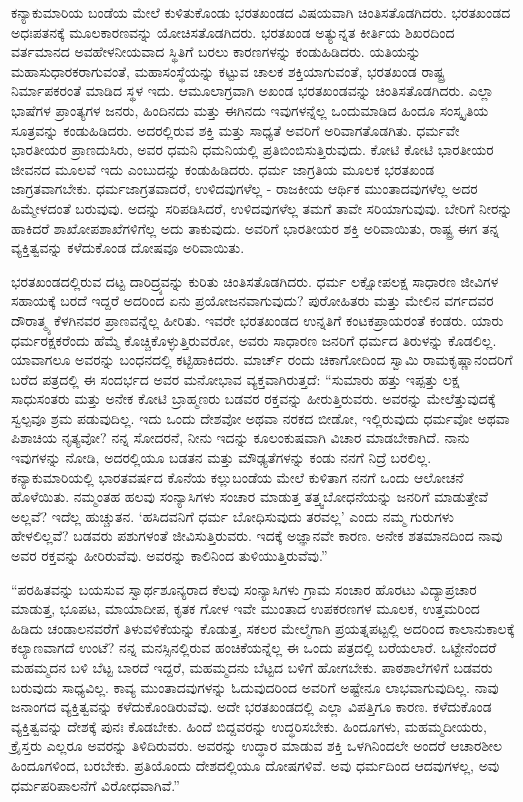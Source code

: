  ಕನ್ಯಾಕುಮಾರಿಯ ಬಂಡೆಯ ಮೇಲೆ ಕುಳಿತುಕೊಂಡು ಭರತಖಂಡದ ವಿಷಯವಾಗಿ ಚಿಂತಿಸತೊಡಗಿದರು. ಭರತಖಂಡದ ಅಧಃಪತನಕ್ಕೆ ಮೂಲಕಾರಣವನ್ನು ಯೋಚಿಸತೊಡಗಿದರು. ಭರತಖಂಡ ಅತ್ಯುನ್ನತ ಕೀರ್ತಿಯ ಶಿಖರದಿಂದ ವರ್ತಮಾನದ ಅವಹೇಳನೀಯವಾದ ಸ್ಥಿತಿಗೆ ಬರಲು ಕಾರಣಗಳನ್ನು ಕಂಡುಹಿಡಿದರು. ಯತಿಯನ್ನು ಮಹಾಸುಧಾರಕರಾಗುವಂತೆ, ಮಹಾಸಂಸ್ಥೆಯನ್ನು ಕಟ್ಟುವ ಚಾಲಕ ಶಕ್ತಿಯಾಗುವಂತೆ, ಭರತಖಂಡ ರಾಷ್ಟ್ರ ನಿರ್ಮಾಪಕರಂತೆ ಮಾಡಿದ ಸ್ಥಳ ಇದು. ಆಮೂಲಾಗ್ರವಾಗಿ ಅಖಂಡ ಭರತಖಂಡವನ್ನು ಚಿಂತಿಸತೊಡಗಿದರು. ಎಲ್ಲಾ ಭಾಷೆಗಳ ಪ್ರಾಂತ್ಯಗಳ ಜನರು, ಹಿಂದಿನದು ಮತ್ತು ಈಗಿನದು ಇವುಗಳನ್ನೆಲ್ಲ ಒಂದುಮಾಡಿದ ಹಿಂದೂ ಸಂಸ್ಕೃತಿಯ ಸೂತ್ರವನ್ನು ಕಂಡುಹಿಡಿದರು. ಅದರಲ್ಲಿರುವ ಶಕ್ತಿ ಮತ್ತು ಸಾಧ್ಯತೆ ಅವರಿಗೆ ಅರಿವಾಗತೊಡಗಿತು. ಧರ್ಮವೇ ಭಾರತೀಯರ ಪ್ರಾಣದುಸಿರು, ಅವರ ಧಮನಿ ಧಮನಿಯಲ್ಲಿ ಪ್ರತಿಬಿಂಬಿಸುತ್ತಿರುವುದು. ಕೋಟಿ ಕೋಟಿ ಭಾರತೀಯರ ಜೀವನದ ಮೂಲವೆ ಇದು ಎಂಬುದನ್ನು ಕಂಡುಹಿಡಿದರು. ಧರ್ಮ ಜಾಗ್ರತಿಯ ಮೂಲಕ ಭರತಖಂಡ ಜಾಗ್ರತವಾಗಬೇಕು. ಧರ್ಮಜಾಗ್ರತವಾದರೆ, ಉಳಿದವುಗಳೆಲ್ಲ - ರಾಜಕೀಯ ಆರ್ಥಿಕ ಮುಂತಾದವುಗಳೆಲ್ಲ ಅದರ ಹಿಮ್ಮೇಳದಂತೆ ಬರುವುವು. ಅದನ್ನು ಸರಿಪಡಿಸಿದರೆ, ಉಳಿದವುಗಳೆಲ್ಲ ತಮಗೆ ತಾವೇ ಸರಿಯಾಗುವುವು. ಬೇರಿಗೆ ನೀರನ್ನು ಹಾಕಿದರೆ ಶಾಖೋಪಶಾಖೆಗಳಿಗೆಲ್ಲ ಅದು ತಾಕುವುದು. ಅವರಿಗೆ ಭಾರತೀಯರ ಶಕ್ತಿ ಅರಿವಾಯಿತು, ರಾಷ್ಟ್ರ ಈಗ ತನ್ನ ವ್ಯಕ್ತಿತ್ವವನ್ನು ಕಳೆದುಕೊಂಡ ದೋಷವೂ ಅರಿವಾಯಿತು. 

 ಭರತಖಂಡದಲ್ಲಿರುವ ದಟ್ಟ ದಾರಿದ್ರ್ಯವನ್ನು ಕುರಿತು ಚಿಂತಿಸತೊಡಗಿದರು. ಧರ್ಮ ಲಕ್ಷೋಪಲಕ್ಷ ಸಾಧಾರಣ ಜೀವಿಗಳ ಸಹಾಯಕ್ಕೆ ಬರದೆ ಇದ್ದರೆ ಅದರಿಂದ ಏನು ಪ್ರಯೋಜನವಾಗುವುದು? ಪುರೋಹಿತರು ಮತ್ತು ಮೇಲಿನ ವರ್ಗದವರ ದೌರಾತ್ಮ್ಯ ಕೆಳಗಿನವರ ಪ್ರಾಣವನ್ನೆಲ್ಲ ಹೀರಿತು. ಇವರೇ ಭರತಖಂಡದ ಉನ್ನತಿಗೆ ಕಂಟಕಪ್ರಾಯರಂತೆ ಕಂಡರು. ಯಾರು ಧರ್ಮರಕ್ಷಕರೆಂದು ಹೆಮ್ಮೆ ಕೊಚ್ಚಿಕೊಳ್ಳುತ್ತಿರುವರೋ, ಅವರು ಸಾಧಾರಣ ಜನರಿಗೆ ಧರ್ಮದ ತಿರುಳನ್ನು ಕೊಡಲಿಲ್ಲ. ಯಾವಾಗಲೂ ಅವರನ್ನು ಬಂಧನದಲ್ಲಿ ಕಟ್ಟಿಹಾಕಿದರು.  ಮಾರ್ಚ್ ರಂದು ಚಿಕಾಗೋದಿಂದ ಸ್ವಾಮಿ ರಾಮಕೃಷ್ಣಾನಂದರಿಗೆ ಬರೆದ ಪತ್ರದಲ್ಲಿ ಈ ಸಂದರ್ಭದ ಅವರ ಮನೋಭಾವ ವ್ಯಕ್ತವಾಗಿರುತ್ತದೆ: “ಸುಮಾರು ಹತ್ತು ಇಪ್ಪತ್ತು ಲಕ್ಷ ಸಾಧುಸಂತರು ಮತ್ತು ಅನೇಕ ಕೋಟಿ ಬ್ರಾಹ್ಮಣರು ಬಡವರ ರಕ್ತವನ್ನು ಹೀರುತ್ತಿರುವರು. ಅವರನ್ನು ಮೇಲೆತ್ತುವುದಕ್ಕೆ ಸ್ವಲ್ಪವೂ ಶ್ರಮ ಪಡುವುದಿಲ್ಲ. ಇದು ಒಂದು ದೇಶವೋ ಅಥವಾ ನರಕದ ಬೀಡೋ, ಇಲ್ಲಿರುವುದು ಧರ್ಮವೋ ಅಥವಾ ಪಿಶಾಚಿಯ ನೃತ್ಯವೋ? ನನ್ನ ಸೋದರನೆ, ನೀನು ಇದನ್ನು ಕೂಲಂಕುಷವಾಗಿ ವಿಚಾರ ಮಾಡಬೇಕಾಗಿದೆ. ನಾನು ಇವುಗಳನ್ನು ನೋಡಿ, ಅದರಲ್ಲಿಯೂ ಬಡತನ ಮತ್ತು ಮೌಢ್ಯತೆಗಳನ್ನು ಕಂಡು ನನಗೆ ನಿದ್ರೆ ಬರಲಿಲ್ಲ. ಕನ್ಯಾಕುಮಾರಿಯಲ್ಲಿ ಭಾರತವರ್ಷದ ಕೊನೆಯ ಕಲ್ಲುಬಂಡೆಯ ಮೇಲೆ ಕುಳಿತಾಗ ನನಗೆ ಒಂದು ಆಲೋಚನೆ ಹೊಳೆಯಿತು. ನಮ್ಮಂತಹ ಹಲವು ಸಂನ್ಯಾಸಿಗಳು ಸಂಚಾರ ಮಾಡುತ್ತ ತತ್ತ್ವಬೋಧನೆಯನ್ನು ಜನರಿಗೆ ಮಾಡುತ್ತೇವೆ ಅಲ್ಲವೆ? ಇದೆಲ್ಲ ಹುಚ್ಚುತನ. ‘ಹಸಿದವನಿಗೆ ಧರ್ಮ ಬೋಧಿಸುವುದು ತರವಲ್ಲ’ ಎಂದು ನಮ್ಮ ಗುರುಗಳು ಹೇಳಲಿಲ್ಲವೆ? ಬಡವರು ಪಶುಗಳಂತೆ ಜೀವಿಸುತ್ತಿರುವರು. ಇದಕ್ಕೆ ಅಜ್ಞಾನವೇ ಕಾರಣ. ಅನೇಕ ಶತಮಾನದಿಂದ ನಾವು ಅವರ ರಕ್ತವನ್ನು ಹೀರಿರುವೆವು. ಅವರನ್ನು ಕಾಲಿನಿಂದ ತುಳಿಯುತ್ತಿರುವೆವು.” 

 “ಪರಹಿತವನ್ನು ಬಯಸುವ ಸ್ವಾರ್ಥಶೂನ್ಯರಾದ ಕೆಲವು ಸಂನ್ಯಾಸಿಗಳು ಗ್ರಾಮ ಸಂಚಾರ ಹೊರಟು ವಿದ್ಯಾಪ್ರಚಾರ ಮಾಡುತ್ತ, ಭೂಪಟ, ಮಾಯಾದೀಪ, ಕೃತಕ ಗೋಳ ಇವೇ ಮುಂತಾದ ಉಪಕರಣಗಳ ಮೂಲಕ, ಉತ್ತಮರಿಂದ ಹಿಡಿದು ಚಂಡಾಲನವರೆಗೆ ತಿಳುವಳಿಕೆಯನ್ನು ಕೊಡುತ್ತ, ಸಕಲರ ಮೇಲ್ಮೆಗಾಗಿ ಪ್ರಯತ್ನಪಟ್ಟಲ್ಲಿ ಅದರಿಂದ ಕಾಲಾನುಕಾಲಕ್ಕೆ ಕಲ್ಯಾಣವಾಗದೆ ಉಂಟೆ? ನನ್ನ ಮನಸ್ಸಿನಲ್ಲಿರುವ ಹಂಚಿಕೆಯನ್ನೆಲ್ಲ ಈ ಒಂದು ಪತ್ರದಲ್ಲಿ ಬರೆಯಲಾರೆ. ಒಟ್ಟೇನೆಂದರೆ ಮಹಮ್ಮದನ ಬಳಿ ಬೆಟ್ಟ ಬಾರದೆ ಇದ್ದರೆ, ಮಹಮ್ಮದನು ಬೆಟ್ಟದ ಬಳಿಗೆ ಹೋಗಬೇಕು. ಪಾಠಶಾಲೆಗಳಿಗೆ ಬಡವರು ಬರುವುದು ಸಾಧ್ಯವಿಲ್ಲ. ಕಾವ್ಯ ಮುಂತಾದವುಗಳನ್ನು ಓದುವುದರಿಂದ ಅವರಿಗೆ ಅಷ್ಟೇನೂ ಲಾಭವಾಗುವುದಿಲ್ಲ. ನಾವು ಜನಾಂಗದ ವ್ಯಕ್ತಿತ್ವವನ್ನು ಕಳೆದುಕೊಂಡಿರುವೆವು. ಅದೇ ಭರತಖಂಡದಲ್ಲಿ ಎಲ್ಲಾ ವಿಪತ್ತಿಗೂ ಕಾರಣ. ಕಳೆದುಕೊಂಡ ವ್ಯಕ್ತಿತ್ವವನ್ನು ದೇಶಕ್ಕೆ ಪುನಃ ಕೊಡಬೇಕು. ಹಿಂದೆ ಬಿದ್ದವರನ್ನು ಉದ್ಧರಿಸಬೇಕು. ಹಿಂದೂಗಳು, ಮಹಮ್ಮದೀಯರು, ಕ್ರೈಸ್ತರು ಎಲ್ಲರೂ ಅವರನ್ನು ತಿಳಿದಿರುವರು. ಅವರನ್ನು ಉದ್ಧಾರ ಮಾಡುವ ಶಕ್ತಿ ಒಳಗಿನಿಂದಲೇ ಅಂದರೆ ಆಚಾರಶೀಲ ಹಿಂದೂಗಳಿಂದ, ಬರಬೇಕು. ಪ್ರತಿಯೊಂದು ದೇಶದಲ್ಲಿಯೂ ದೋಷಗಳಿವೆ. ಅವು ಧರ್ಮದಿಂದ ಆದವುಗಳಲ್ಲ, ಅವು ಧರ್ಮಪರಿಪಾಲನೆಗೆ ವಿರೋಧವಾಗಿವೆ.” 

